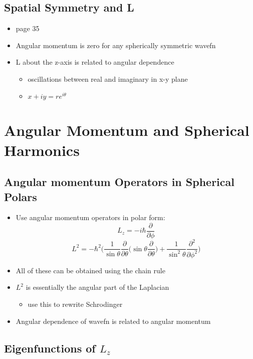 \documentclass[a4paper,11pt,normalem]{article}
\begin{document}
\subsection{Spatial Symmetry and L}\label{spatial-symmetry-and-l}
\begin{itemize}
\item
  page 35
\item
  Angular momentum is zero for any spherically symmetric wavefn
\item
  L about the z-axis is related to angular dependence
  \begin{itemize}
  \item
    oscillations between real and imaginary in x-y plane
  \item
    \(x + iy = re^{i\theta}\)
  \end{itemize}
\end{itemize}

\section{Angular Momentum and Spherical Harmonics}\label{angular-momentum-and-spherical-harmonics}

\subsection{Angular momentum Operators in Spherical Polars}\label{angular-momentum-operators-in-spherical-polars}

\begin{itemize}
\item
  Use angular momentum operators in polar form: \[
  L_z = -i\hbar \frac{\partial}{\partial\phi}
  \] \[
  L^2 = -\hbar^2 \Big(\frac{1}{\sin\theta}\frac{\partial}{\partial \theta} \big(\sin\theta \frac{\partial}{\partial \theta} \big) + \frac{1}{\sin^2 \theta}\frac{\partial^2}{\partial \phi^2} \Big)
  \]
\item
  All of these can be obtained using the chain rule
\item
  \(L^2\) is essentially the angular part of the Laplacian
  \begin{itemize}
  \item
    use this to rewrite Schrodinger
  \end{itemize}
\item
  Angular dependence of wavefn is related to angular momentum
\end{itemize}

\subsection{Eigenfunctions of $L_z$}\label{eigenfunctions-of-l_z}
\end{document}
